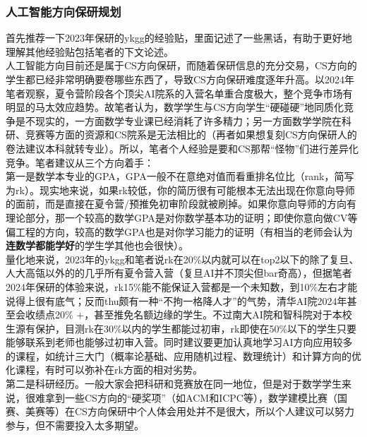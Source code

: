 \documentclass[a4paper,11pt,notitlepage]{article}
\newcommand{\empha}[1]{\textbf{#1}}
\begin{document}
\subsubsection{人工智能方向保研规划}
首先推荐一下2023年保研的ykgg的经验贴\cite{ykgg保研经验贴}，里面记述了一些黑话，有助于更好地理解其他经验贴包括笔者的下文论述。\\
\indent 人工智能方向目前还是属于CS方向保研，而随着保研信息的充分交易，CS方向的学生都已经非常明确要卷哪些东西了，导致CS方向保研难度逐年升高。以2024年笔者观察，夏令营阶段各个顶尖AI院系的入营名单重合度极大，整个竞争市场有明显的马太效应趋势。故笔者认为，数学学生与CS方向学生“硬碰硬”地同质化竞争是不现实的，一方面数学专业课已经消耗了许多精力；另一方面数学学院在科研、竞赛等方面的资源和CS院系是无法相比的（再者如果想复刻CS方向保研人的卷法建议本科就转专业）。所以，笔者个人经验是要和CS那帮“怪物”们进行差异化竞争。笔者建议从三个方向着手：\\
\indent 第一是数学本专业的GPA，GPA一般不在意绝对值而看重排名位比（rank，简写为rk）。现实地来说，如果rk较低，你的简历很有可能根本无法出现在你意向导师的面前，而是直接在夏令营/预推免初审阶段就被刷掉。如果你意向导师的方向有理论部分，那一个较高的数学GPA是对你数学基本功的证明；即使你意向做CV等偏工程的方向，较高的数学GPA也是对你学习能力的证明（有相当的老师会认为\empha{连数学都能学好}的学生学其他也会很快）。\\
\indent 量化地来说，2023年的ykgg和笔者说rk在20\%以内就可以在top2以下的除了复旦、人大高瓴以外的的几乎所有夏令营入营（复旦AI并不顶尖但bar奇高），但据笔者2024年保研的体验来说，rk15\%能不能保证入营都是一个未知数，到10\%左右才能说得上很有底气；反而thu颇有一种“不拘一格降人才”的气势，清华AI院2024年甚至会收绩点20\% +，甚至推免名额边缘的学生。不过南大AI院和智科院对于本校生源有保护，目测rk在30\%以内的学生都能过初审，rk即使在50\%以下的学生只要能够联系到老师也能够过初审入营。同时建议要更加认真地学习AI方向应用较多的课程，如统计三大门（概率论基础、应用随机过程、数理统计）和计算方向的优化课程，有时可以弥补在rk方面的相对劣势。\\
\indent 第二是科研经历。一般大家会把科研和竞赛放在同一地位，但是对于数学学生来说，很难拿到一些CS方向的“硬奖项”（如ACM和ICPC等），数学建模比赛（国赛、美赛等）在CS方向保研中个人体会用处并不是很大，所以个人建议可以努力参与，但不需要投入太多期望。\\
\end{document}
